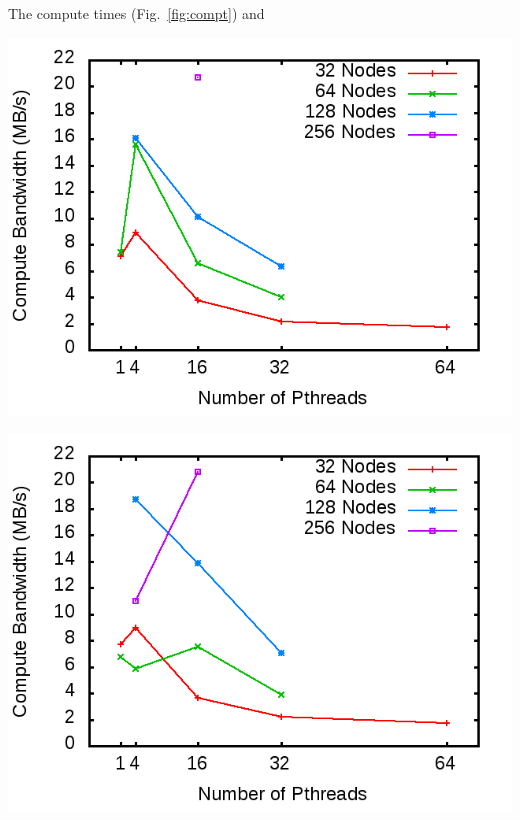 \documentclass[11pt]{article}
\begin{document}
\begin{multicols*}{2}
The compute times (Fig.~\ref{fig:compt}) and

\begin{center}
\begin{minipage}{0.4\textwidth}\centering
  \includegraphics[width=\textwidth]{img/prMC-compBW}

  \includegraphics[width=\textwidth]{img/pr-compBW}
\end{minipage}
\end{center}


\end{multicols*}
\end{document}

